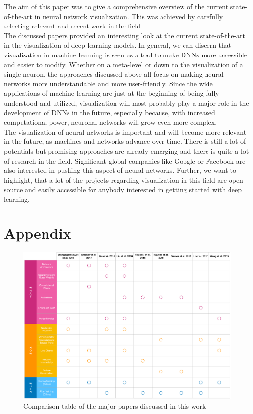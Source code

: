 \documentclass{acmsiggraph}               %
\begin{document}
The aim of this paper was to give a comprehensive overview of the current state-of-the-art in neural network visualization. This was achieved by carefully selecting relevant and recent work in the field.\\

The discussed papers provided an interesting look at the current state-of-the-art in the visualization of deep learning models. In general, we can discern that visualization in machine learning is seen as a tool to make DNNs more accessible and easier to modify. Whether on a meta-level or down to the visualization of a single neuron, the approaches discussed above all focus on making neural networks more understandable and more user-friendly. Since the wide applications of machine learning are just at the beginning of being fully understood and utilized, visualization will most probably play a major role in the development of DNNs in the future, especially because, with increased computational power, neuronal networks will grow even more complex.\\

The visualization of neural networks is important and will become more relevant in the future, as machines and networks advance over time. There is still a lot of potentials but promising approaches are already emerging and there is quite a lot of research in the field. Significant global companies like Google or Facebook are also interested in pushing this aspect of neural networks. Further, we want to highlight, that a lot of the projects regarding visualization in this field are open source and easily accessible for anybody interested in getting started with deep learning. 


\nocite{*}


\clearpage
\section{Appendix}
\begin{figure}[!htb]
  \centering
  \includegraphics[width=\textwidth]{Table}
  \caption{Comparison table of the major papers discussed in this work}
  \label{fig:comparison}
\end{figure}
\end{document}
